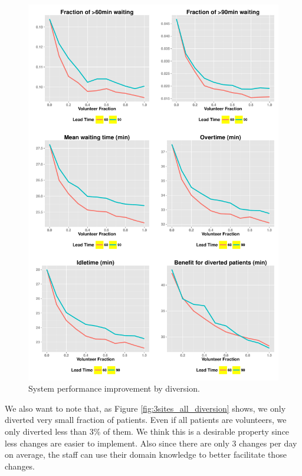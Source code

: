 \begin{figure}[htp]
\centering
\includegraphics[width=.95\textwidth]{chap3/numeric/pic/3sites_all}
\caption{System performance improvement by diversion.}
\label{fig:3sites_all}
\end{figure}

We also want to note that, as Figure \ref{fig:3sites_all_diversion} shows,
we only diverted very small fraction of patients. Even if all patients
are volunteers, we only diverted less than 3\% of them.
We think this is a desirable property since less changes are easier
to implement. Also since there are only 3 changes per day on average,
the staff can use their domain knowledge to better facilitate those
changes.

